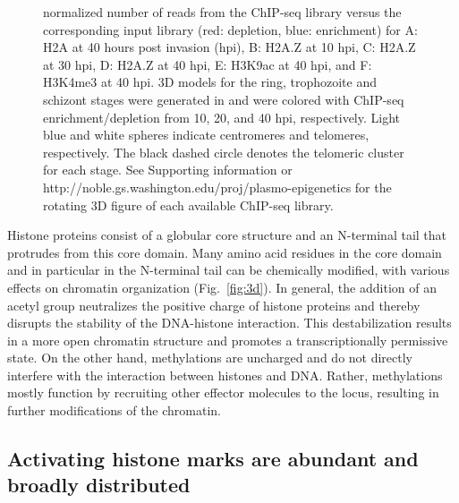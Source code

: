 \begin{figure}
{normalized number of reads from the ChIP-seq library versus the corresponding
input library (red: depletion, blue: enrichment) for A: H2A at
40 hours post invasion (hpi), B: H2A.Z at 10 hpi, C: H2A.Z at 30 hpi, D: H2A.Z
at 40 hpi, E: H3K9ac at 40 hpi, and F: H3K4me3 at 40 hpi. 3D
models for the ring, trophozoite and schizont stages were generated in
\citet{ay:three-dimensional} and were colored with ChIP-seq enrichment/depletion
from 10, 20, and 40 hpi, respectively. Light blue and white spheres indicate
centromeres and telomeres, respectively. The black dashed circle
denotes the telomeric cluster for each stage. See Supporting information or
http://noble.gs.washington.edu/proj/plasmo-epigenetics for the
rotating 3D figure of each available ChIP-seq library.
}
\end{figure}

Histone proteins consist of a globular core structure and an N-terminal tail
that protrudes from this core domain. Many amino acid residues in the core
domain and in particular in the N-terminal tail can be chemically modified,
with various effects on chromatin organization (Fig.~\ref{fig:3d}). In general, the
addition of an acetyl group neutralizes the positive charge of histone
proteins and thereby disrupts the stability of the DNA-histone interaction.
This destabilization results in a more open chromatin structure and promotes a
transcriptionally permissive state. On the other hand, methylations are
uncharged and do not directly interfere with the interaction between histones
and DNA. Rather, methylations mostly function by recruiting other effector
molecules to the locus, resulting in further modifications of the chromatin.

\subsection{Activating histone marks are abundant and broadly distributed}

